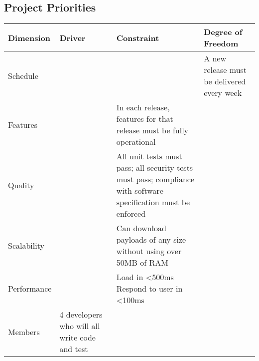 \documentclass[letter]{scrartcl}
\begin{document}
\subsection{Project Priorities}
\begin{tabularx}{\textwidth}{| X | X | X | X |}
\hline
\textbf{Dimension} & \textbf{Driver} & \textbf{Constraint} & \textbf{Degree of Freedom} \\
\hline
\hline
Schedule & & & A new release must be delivered every week \\
\hline
Features & & In each release, features for that release must be fully operational & \\
\hline
Quality  & & All unit tests must pass; all security tests must pass; compliance with software specification must be enforced & \\
\hline
Scalability & & Can download payloads of any size without using over 50MB of RAM & \\
\hline
Performance & &
Load in \textless500ms
Respond to user in \textless100ms
& \\
\hline
Members  & 4 developers who will all write code and test & & \\
\hline
\end{tabularx}
\end{document}
